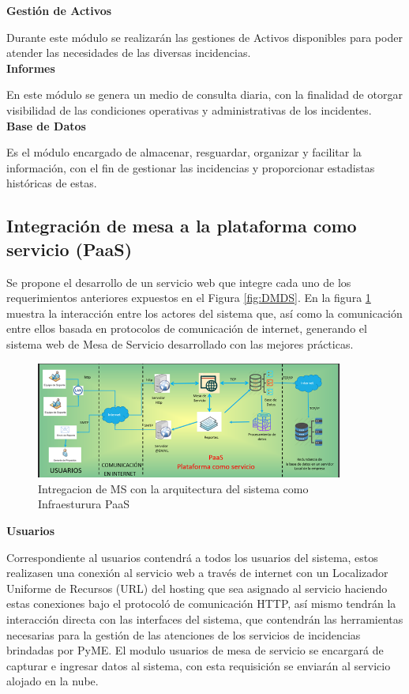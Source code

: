 \textbf{Gestión de Activos }

Durante este módulo se realizarán las gestiones de Activos disponibles para poder atender las necesidades de las diversas incidencias.\\

\textbf{ Informes }

En este módulo se genera un medio de consulta diaria, con la finalidad de otorgar visibilidad de las condiciones operativas y administrativas de los incidentes.\\

\textbf{ Base de Datos }

Es el módulo encargado de almacenar, resguardar, organizar y facilitar la información, con el fin de gestionar las incidencias y proporcionar estadistas históricas de estas.

\subsection{Integración de mesa a la plataforma como servicio (PaaS)}


Se propone el desarrollo de un servicio web que integre cada uno de los requerimientos anteriores expuestos en el Figura \ref{fig:DMDS}. En la figura \ref{fig:AMDS} muestra la interacción entre los actores del sistema que, así como la comunicación entre ellos basada en protocolos de comunicación de internet, generando el sistema web de Mesa de Servicio desarrollado con las mejores prácticas.

\begin{figure}[htb]
	\centering
	\includegraphics[width=0.9\textwidth]{Capitulo1/Img/AMDS}
	\caption{Intregacion de MS con la arquitectura del sistema como Infraesturura PaaS}
	\label{fig:AMDS}
\end{figure}

 \textbf{Usuarios}
 
Correspondiente al usuarios contendrá a todos los usuarios del sistema, estos realizasen una conexión al servicio web a través de internet con un Localizador Uniforme de Recursos (URL) del hosting que sea asignado al servicio haciendo estas conexiones bajo el protocoló de comunicación HTTP, así mismo tendrán la interacción directa con las interfaces del sistema, que contendrán las herramientas necesarias para la gestión de las atenciones de los servicios de incidencias brindadas por PyME. 
El modulo  usuarios de mesa de servicio se encargará de capturar e ingresar datos al sistema, con esta requisición se enviarán al servicio alojado en la nube.

